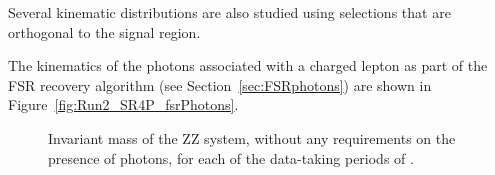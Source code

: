 Several kinematic distributions are also studied using selections that are orthogonal to the signal region.

The kinematics of the photons associated with a charged lepton
as part of the FSR recovery algorithm (see Section~\ref{sec:FSRphotons})
are shown in Figure~\ref{fig:Run2_SR4P_fsrPhotons}.

\begin{figure}
%
%
%
\caption{Invariant mass of the ZZ system, without any requirements on the presence of photons, for each of the data-taking periods of .}
\label{fig:ZZmass_byyear}
\end{figure}

